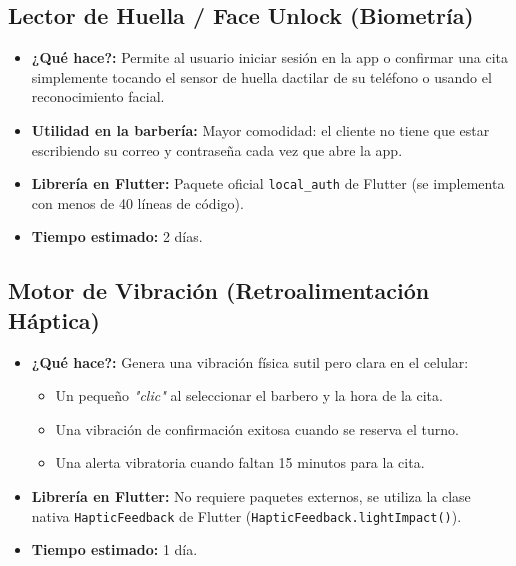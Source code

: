 \documentclass[11pt,a4paper]{article}
\begin{document}
\subsection{Lector de Huella / Face Unlock (Biometría)}

\begin{itemize}
    \item \textbf{¿Qué hace?:} Permite al usuario iniciar sesión en la app o confirmar una cita simplemente tocando el sensor de huella dactilar de su teléfono o usando el reconocimiento facial.
    \item \textbf{Utilidad en la barbería:} Mayor comodidad: el cliente no tiene que estar escribiendo su correo y contraseña cada vez que abre la app.
    \item \textbf{Librería en Flutter:} Paquete oficial \texttt{local\_auth} de Flutter (se implementa con menos de 40 líneas de código).
    \item \textbf{Tiempo estimado:} 2 días.
\end{itemize}

\subsection{Motor de Vibración (Retroalimentación Háptica)}

\begin{itemize}
    \item \textbf{¿Qué hace?:} Genera una vibración física sutil pero clara en el celular:
    \begin{itemize}
        \item Un pequeño \textit{"clic"} al seleccionar el barbero y la hora de la cita.
        \item Una vibración de confirmación exitosa cuando se reserva el turno.
        \item Una alerta vibratoria cuando faltan 15 minutos para la cita.
    \end{itemize}
    \item \textbf{Librería en Flutter:} No requiere paquetes externos, se utiliza la clase nativa \texttt{HapticFeedback} de Flutter (\texttt{HapticFeedback.lightImpact()}).
    \item \textbf{Tiempo estimado:} 1 día.
\end{itemize}
\end{document}
